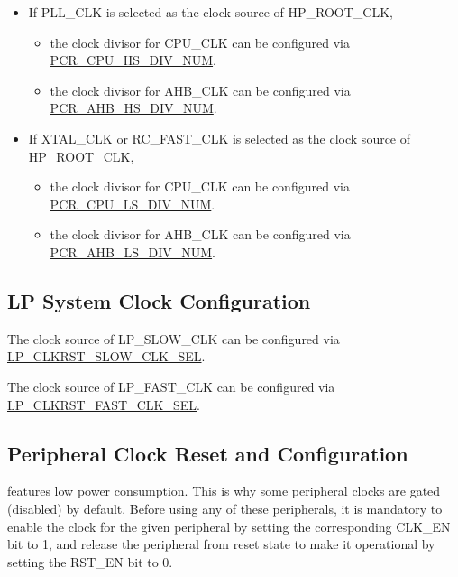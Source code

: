 \documentclass[main\_\_EN.tex]{subfiles}
\begin{document}
\begin{itemize}
    \item If PLL\_CLK is selected as the clock source of HP\_ROOT\_CLK,
    \begin{itemize}
        \item the clock divisor for CPU\_CLK can be configured via \hyperref[fielddesc:PCRCPUHSDIVNUM]{PCR\_CPU\_HS\_DIV\_NUM}.
        \item the clock divisor for AHB\_CLK can be configured via \hyperref[fielddesc:PCRAHBHSDIVNUM]{PCR\_AHB\_HS\_DIV\_NUM}.
    \end{itemize}

    \item If XTAL\_CLK or RC\_FAST\_CLK is selected as the clock source of HP\_ROOT\_CLK,
    \begin{itemize}
        \item the clock divisor for CPU\_CLK can be configured via \hyperref[fielddesc:PCRCPULSDIVNUM]{PCR\_CPU\_LS\_DIV\_NUM}.
        \item the clock divisor for AHB\_CLK can be configured via \hyperref[fielddesc:PCRAHBLSDIVNUM]{PCR\_AHB\_LS\_DIV\_NUM}.
    \end{itemize}
\end{itemize}

\subsection{LP System Clock Configuration}

The clock source of LP\_SLOW\_CLK can be configured via \hyperref[fielddesc:LPCLKRSTSLOWCLKSEL]{LP\_CLKRST\_SLOW\_CLK\_SEL}.

The clock source of LP\_FAST\_CLK can be configured via \hyperref[fielddesc:LPCLKRSTFASTCLKSEL]{LP\_CLKRST\_FAST\_CLK\_SEL}.

\subsection{Peripheral Clock Reset and Configuration} \label{sec:periperal-clock-configuration}

\begin{importantlisting}
\vspace{-0.5em}

\chipname{} features low power consumption. This is why some peripheral clocks are gated (disabled) by default. Before using any of these peripherals, it is mandatory to enable the clock for the given peripheral by setting the corresponding CLK\_EN bit to 1, and release the peripheral from reset state to make it operational by setting the RST\_EN bit to 0.
\end{importantlisting}
\end{document}
